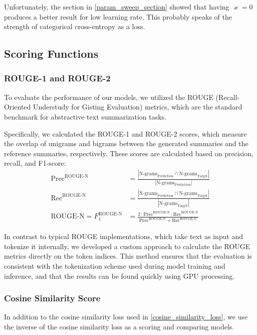 Unfortunately, the section in \cref{param_sweep_section} showed that having $\varkappa = 0$ produces a better result for low learning rate.
This probably speaks of the strength of categorical cross-entropy as a loss.

\subsection{Scoring Functions}
\label{scoring_section}
\subsubsection{ROUGE-1 and ROUGE-2}
To evaluate the performance of our models, we utilized the ROUGE (Recall-Oriented Understudy for Gisting Evaluation) metrics, which are the standard benchmark for abstractive text summarization tasks\cite{abstCNN}.

Specifically, we calculated the ROUGE-1 and ROUGE-2 scores, which measure the overlap of unigrams and bigrams between the generated summaries and the reference summaries, respectively. These scores are calculated based on precision, recall, and F1-score:
\begin{equation}
	\begin{aligned}
		\text{Prec}^{\text{ROUGE-N}} &= \frac{\left|\text{N-grams}_{\text{Prediction}} \cap \text{N-grams}_{\text{Target}}\right|}{\left|\text{N-grams}_{\text{Prediction}}\right|} \\
		\text{Rec}^{\text{ROUGE-N}} &= \frac{\left|\text{N-grams}_{\text{Prediction}} \cap \text{N-grams}_{\text{Target}}\right|}{\left|\text{N-grams}_{\text{Target}}\right|} \\[1em]
		\text{ROUGE-N} = F_1^{\text{ROUGE-N}} &= \frac{2 \cdot \text{Prec}^{\text{ROUGE-N}} \cdot \text{Rec}^{\text{ROUGE-N}}}{\text{Prec}^{\text{ROUGE-N}} + \text{Rec}^{\text{ROUGE-N}}}
	\end{aligned}
\end{equation}

In contrast to typical ROUGE implementations, which take text as input and tokenize it internally, we developed a custom approach to calculate the ROUGE metrics directly on the token indices.
This method ensures that the evaluation is consistent with the tokenization scheme used during model training and inference, and that the results can be found quickly using GPU processing.

\subsubsection{Cosine Similarity Score}
\label{cosine_similarity_score}
In addition to the cosine similarity loss used in \cref{cosine_similarity_loss}, we use the inverse of the cosine similarity loss as a scoring and comparing models.

